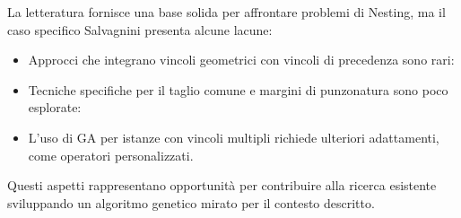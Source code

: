 La letteratura fornisce una base solida per affrontare problemi di Nesting, ma il caso specifico Salvagnini presenta alcune lacune:

\begin{itemize}
    \item Approcci che integrano vincoli geometrici con vincoli di precedenza sono rari:
    \item Tecniche specifiche per il taglio comune e margini di punzonatura sono poco esplorate:
    \item L'uso di GA per istanze con vincoli multipli richiede ulteriori adattamenti, come operatori personalizzati.
\end{itemize}

Questi aspetti rappresentano opportunità per contribuire alla ricerca esistente sviluppando un algoritmo genetico mirato per il contesto descritto.